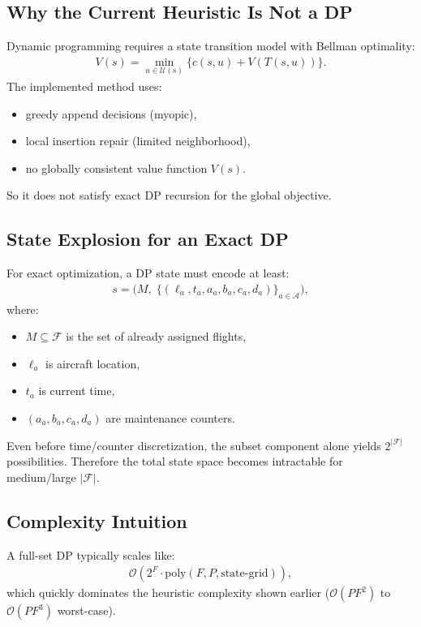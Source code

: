 \documentclass[11pt,a4paper]{article}
\begin{document}
\subsection{Why the Current Heuristic Is Not a DP}
Dynamic programming requires a state transition model with Bellman optimality:
\begin{align*}
V(s) = \min_{u \in \mathcal{U}(s)} \{ c(s,u) + V(T(s,u)) \}.
\end{align*}
The implemented method uses:
\begin{itemize}[leftmargin=1.4em]
    \item greedy append decisions (myopic),
    \item local insertion repair (limited neighborhood),
    \item no globally consistent value function $V(s)$.
\end{itemize}
So it does not satisfy exact DP recursion for the global objective.

\subsection{State Explosion for an Exact DP}
For exact optimization, a DP state must encode at least:
\begin{align*}
s = \Big(M,\; \{(\ell_a, t_a, a_a, b_a, c_a, d_a)\}_{a \in \mathcal{A}}\Big),
\end{align*}
where:
\begin{itemize}[leftmargin=1.4em]
    \item $M \subseteq \mathcal{F}$ is the set of already assigned flights,
    \item $\ell_a$ is aircraft location,
    \item $t_a$ is current time,
    \item $(a_a,b_a,c_a,d_a)$ are maintenance counters.
\end{itemize}

Even before time/counter discretization, the subset component alone yields $2^{|\mathcal{F}|}$ possibilities. Therefore the total state space becomes intractable for medium/large $|\mathcal{F}|$.

\subsection{Complexity Intuition}
A full-set DP typically scales like:
\begin{align*}
\mathcal{O}(2^{F} \cdot \text{poly}(F,P,\text{state-grid})),
\end{align*}
which quickly dominates the heuristic complexity shown earlier ($\mathcal{O}(PF^2)$ to $\mathcal{O}(PF^3)$ worst-case).
\end{document}
